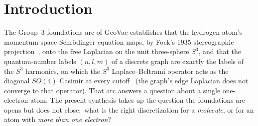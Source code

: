 \documentclass[aps,pra,twocolumn,superscriptaddress,longbibliography]{revtex4-2}
\newcommand{\gvc}[2]{#2}
\begin{document}
\begin{abstract}
equilibrium-bond-length error for LiH, $\mathrm{BeH}_2$, and
$\mathrm{H}_2\mathrm{O}$ respectively.  The classical-solver
investigation is complete:\ its accuracy ceilings are characterized,
and the framework is positioned as a zero-parameter, structurally
sparse \emph{research instrument}---a computationally principled
alternative whose primary downstream value (qubit-Hamiltonian sparsity
for quantum simulation) lives in the quantum-computing arc---not as a
replacement for production quantum chemistry.  The discrete label lattice and the continuous Laplace--Beltrami
operator are dual descriptions of the same quantum-number structure,
linked by an exact Peter--Weyl label identification (the lattice's
labels are those of the $S^3$ harmonics, on which the operator acts as
the diagonal $SO(4)$ Casimir), with Fock's proven conformal projection
linking the operator to the Schr\"odinger equation (\gvc{graph-s3-wall}{the lattice's
graph Laplacian is not one of the two:\ it does not converge to
$\Delta_{S^3}$, Paper~7}); the interpretive question of which
is more fundamental is left open.
\end{abstract}

\maketitle

\section{Introduction}
\label{sec:intro}

The Group~3 foundations arc of GeoVac establishes that the hydrogen
atom's momentum-space Schr\"odinger equation maps, by Fock's 1935
stereographic projection~\cite{fock1935}, onto the free Laplacian on
the unit three-sphere $S^3$, and that the quantum-number labels
$(n,l,m)$ of a discrete graph are exactly the labels of the $S^3$
harmonics, on which the $S^3$ Laplace--Beltrami operator acts as the
diagonal $SO(4)$ Casimir at every cutoff~\cite{loutey_paper0, loutey_paper1,
loutey_paper7} (\gvc{graph-s3-wall}{the graph's edge Laplacian does not converge to that operator}).  That arc answers a question about a single
one-electron atom.  The present synthesis takes up the question the
foundations arc opens but does not close:\ what is the right
discretization for a \emph{molecule}, or for an atom with \emph{more
than one electron}?
\end{document}
